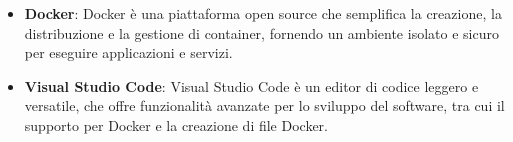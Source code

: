 \begin{itemize}
	\item \textbf{Docker}: Docker è una piattaforma open source che semplifica la creazione, la distribuzione e la gestione di container, fornendo un ambiente isolato e sicuro per eseguire applicazioni e servizi.
	\item \textbf{Visual Studio Code}: Visual Studio Code è un editor di codice leggero e versatile, che offre funzionalità avanzate per lo sviluppo del software, tra cui il supporto per Docker e la creazione di file Docker.
\end{itemize}